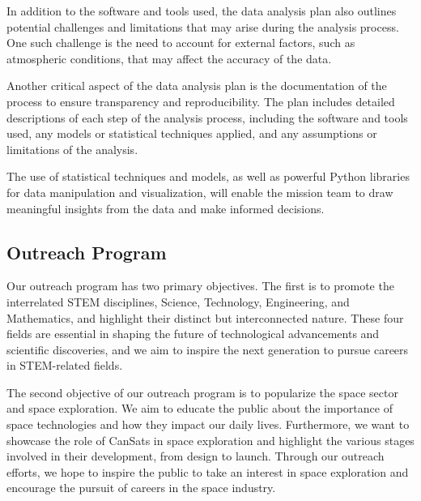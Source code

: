 \documentclass[11pt]{article}
\begin{document}
In addition to the software and tools used, the data analysis plan also outlines potential challenges and limitations that may arise during the analysis process. One such challenge is the need to account for external factors, such as atmospheric conditions, that may affect the accuracy of the data.

Another critical aspect of the data analysis plan is the documentation of the process to ensure transparency and reproducibility. The plan includes detailed descriptions of each step of the analysis process, including the software and tools used, any models or statistical techniques applied, and any assumptions or limitations of the analysis.

The use of statistical techniques and models, as well as powerful Python libraries for data manipulation and visualization, will enable the mission team to draw meaningful insights from the data and make informed decisions.

\subsection{Outreach Program}

Our outreach program has two primary objectives. The first is to promote the interrelated STEM disciplines, Science, Technology, Engineering, and Mathematics, and highlight their distinct but interconnected nature. These four fields are essential in shaping the future of technological advancements and scientific discoveries, and we aim to inspire the next generation to pursue careers in STEM-related fields.

The second objective of our outreach program is to popularize the space sector and space exploration. We aim to educate the public about the importance of space technologies and how they impact our daily lives. Furthermore, we want to showcase the role of CanSats in space exploration and highlight the various stages involved in their development, from design to launch. Through our outreach efforts, we hope to inspire the public to take an interest in space exploration and encourage the pursuit of careers in the space industry.
\end{document}
